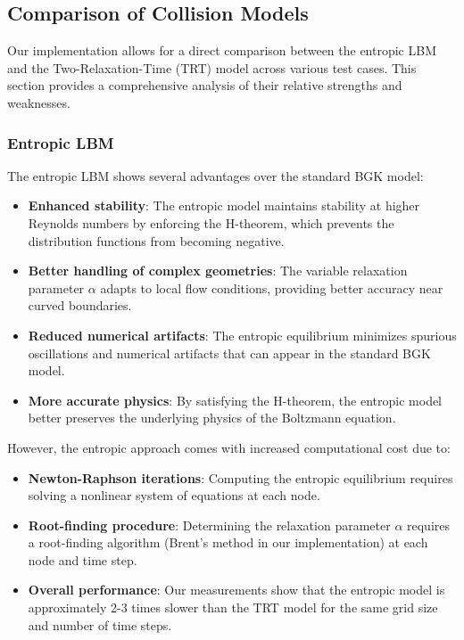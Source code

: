 \documentclass[12pt,a4paper]{article}
\begin{document}
\subsection{Comparison of Collision Models}

Our implementation allows for a direct comparison between the entropic LBM and the Two-Relaxation-Time (TRT) model across various test cases. This section provides a comprehensive analysis of their relative strengths and weaknesses.

\subsubsection{Entropic LBM}
The entropic LBM shows several advantages over the standard BGK model:
\begin{itemize}
    \item \textbf{Enhanced stability}: The entropic model maintains stability at higher Reynolds numbers by enforcing the H-theorem, which prevents the distribution functions from becoming negative.
    \item \textbf{Better handling of complex geometries}: The variable relaxation parameter $\alpha$ adapts to local flow conditions, providing better accuracy near curved boundaries.
    \item \textbf{Reduced numerical artifacts}: The entropic equilibrium minimizes spurious oscillations and numerical artifacts that can appear in the standard BGK model.
    \item \textbf{More accurate physics}: By satisfying the H-theorem, the entropic model better preserves the underlying physics of the Boltzmann equation.
\end{itemize}

However, the entropic approach comes with increased computational cost due to:
\begin{itemize}
    \item \textbf{Newton-Raphson iterations}: Computing the entropic equilibrium requires solving a nonlinear system of equations at each node.
    \item \textbf{Root-finding procedure}: Determining the relaxation parameter $\alpha$ requires a root-finding algorithm (Brent's method in our implementation) at each node and time step.
    \item \textbf{Overall performance}: Our measurements show that the entropic model is approximately 2-3 times slower than the TRT model for the same grid size and number of time steps.
\end{itemize}
\end{document}
